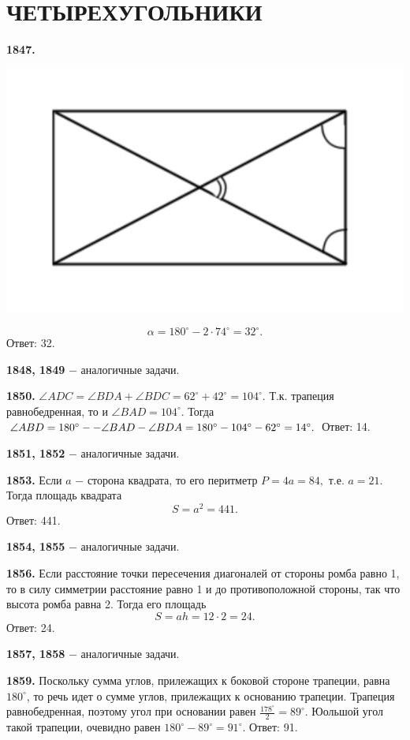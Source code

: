 \section{ЧЕТЫРЕХУГОЛЬНИКИ}

\textbf{1847.}

{\centering \includegraphics[width=0.5\linewidth]{Geometry/Content/19.png}
	
}
\[
\alpha = 180^\circ - 2\cdot 74^\circ = 32^\circ.
\] \null \hspace*{\fill} Ответ: 32.

\textbf{1848, 1849} $-$ аналогичные задачи.

\textbf{1850.} $\angle ADC = \angle BDA + \angle BDC = 62^\circ + 42^\circ = 104^\circ.$ Т.к. трапеция равнобедренная, то и $\angle BAD = 104^\circ$. Тогда $\angle ABD = 180^\circ -\linebreak- \angle BAD - \angle BDA = 180^\circ - 104^\circ - 62^\circ = 14^\circ.$ \newline \null \hspace*{\fill} Ответ: 14.

\textbf{1851, 1852} $-$ аналогичные задачи.

\textbf{1853.} Если $a$ $-$ сторона квадрата, то его перитметр $P = 4a = 84,$ т.е. $a = 21$. Тогда площадь квадрата 
\[
S = a^2 = 441.
\]\null \hspace*{\fill} Ответ: 441.

\textbf{1854, 1855} $-$ аналогичные задачи.

\textbf{1856.} Если расстояние точки пересечения диагоналей от стороны ромба равно 1, то в силу симметрии расстояние равно 1 и до противоположной стороны, так что высота ромба равна 2. Тогда его площадь 
\[
S = ah = 12\cdot 2 = 24.
\]\null \hspace*{\fill} Ответ: 24.

\textbf{1857, 1858} $-$ аналогичные задачи.

\textbf{1859.} Поскольку сумма углов, прилежащих к боковой стороне трапеции, равна $180^\circ$, то речь идет о сумме углов, прилежащих к основанию трапеции. Трапеция равнобедренная, поэтому угол при основании равен $\frac{178^\circ}{2} = 89^\circ$. Юольшой угол такой трапеции, очевидно равен $180^\circ - 89^\circ = 91^\circ.$ \newline \null \hspace*{\fill} Ответ: 91.

